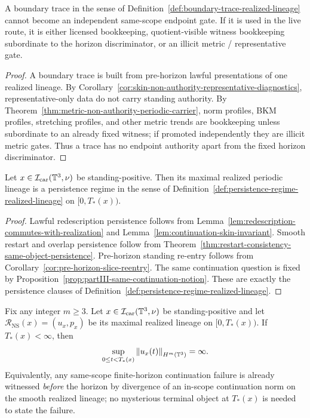 \begin{manuallemma}
\label{lem:boundary-trace-nonpromotion}
A boundary trace in the sense of Definition~\ref{def:boundary-trace-realized-lineage} cannot become an independent same-scope endpoint gate. If it is used in the live route, it is either licensed bookkeeping, quotient-visible witness bookkeeping subordinate to the horizon discriminator, or an illicit metric / representative gate.
\end{manuallemma}

\begin{proof}
A boundary trace is built from pre-horizon lawful presentations of one realized lineage. By Corollary~\ref{cor:skin-non-authority-representative-diagnostics}, representative-only data do not carry standing authority. By Theorem~\ref{thm:metric-non-authority-periodic-carrier}, norm profiles, BKM profiles, stretching profiles, and other metric trends are bookkeeping unless subordinate to an already fixed witness; if promoted independently they are illicit metric gates. Thus a trace has no endpoint authority apart from the fixed horizon discriminator.
\end{proof}

\begin{manuallemma}
\label{lem:persistence-regime-realization}
Let $x\in\mathcal I_{\mathrm{car}}(\mathbb{T}^3,\nu)$ be standing-positive. Then its maximal realized periodic lineage is a persistence regime in the sense of Definition~\ref{def:persistence-regime-realized-lineage} on $[0,T_*(x))$.
\end{manuallemma}

\begin{proof}
Lawful redescription persistence follows from Lemma~\ref{lem:redescription-commutes-with-realization} and Lemma~\ref{lem:continuation-skin-invariant}. Smooth restart and overlap persistence follow from Theorem~\ref{thm:restart-consistency-same-object-persistence}. Pre-horizon standing re-entry follows from Corollary~\ref{cor:pre-horizon-slice-reentry}. The same continuation question is fixed by Proposition~\ref{prop:partIII-same-continuation-notion}. These are exactly the persistence clauses of Definition~\ref{def:persistence-regime-realized-lineage}.
\end{proof}

\begin{manuallemma}
\label{lem:finite-horizon-witness}
Fix any integer $m\ge 3$. Let $x\in\mathcal I_{\mathrm{car}}(\mathbb{T}^3,\nu)$ be standing-positive and let $\mathcal R_{\mathrm{NS}}(x)=(u_x,p_x)$ be its maximal realized lineage on $[0,T_*(x))$. If $T_*(x)<\infty$, then
\[
\sup_{0\le t<T_*(x)} \left\lVert u_x(t)\right\rVert_{H^m(\mathbb{T}^3)}=\infty.
\]
Equivalently, any same-scope finite-horizon continuation failure is already witnessed \emph{before} the horizon by divergence of an in-scope continuation norm on the smooth realized lineage; no mysterious terminal object at $T_*(x)$ is needed to state the failure.
\end{manuallemma}

